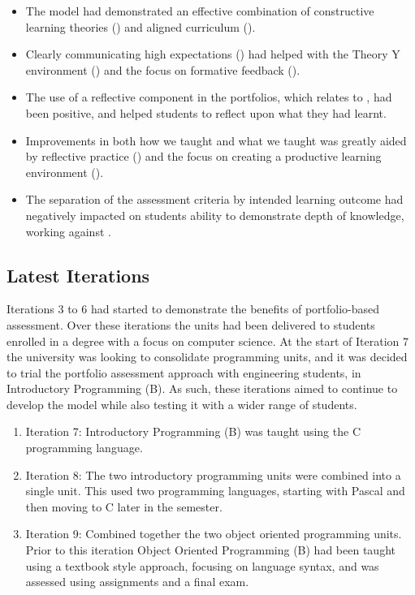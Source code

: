 \begin{itemize}[noitemsep,nolistsep]
	\item The model had demonstrated an effective combination of constructive learning theories () and aligned curriculum ().
	\item Clearly communicating high expectations () had helped with the Theory Y environment () and the focus on formative feedback ().
	\item The use of a reflective component in the portfolios, which relates to , had been positive, and helped students to reflect upon what they had learnt.
	\item Improvements in both how we taught and what we taught was greatly aided by reflective practice () and the focus on creating a productive learning environment ().
	\item The separation of the assessment criteria by intended learning outcome had negatively impacted on students ability to demonstrate depth of knowledge, working against .
\end{itemize}




\clearpage
\subsection{Latest Iterations} %
\label{sub:latest_iterations}

Iterations 3 to 6 had started to demonstrate the benefits of portfolio-based assessment. Over these iterations the units had been delivered to students enrolled in a degree with a focus on computer science. At the start of Iteration 7 the university was looking to consolidate programming units, and it was decided to trial the portfolio assessment approach with engineering students, in Introductory Programming (B). As such, these iterations aimed to continue to develop the model while also testing it with a wider range of students.

\begin{enumerate}
	\item Iteration 7: Introductory Programming (B) was taught using the C programming language.
	\item Iteration 8: The two introductory programming units were combined into a single unit. This used two programming languages, starting with Pascal and then moving to C later in the semester.
	\item Iteration 9: Combined together the two object oriented programming units. Prior to this iteration Object Oriented Programming (B) had been taught using a textbook style approach, focusing on language syntax, and was assessed using assignments and a final exam.
\end{enumerate}

